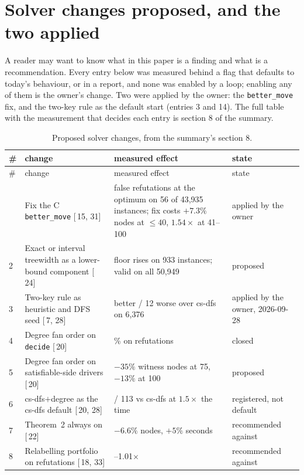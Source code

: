 \documentclass[11pt,a4paper]{article}
\renewcommand{\S}[1]{[\textsection\,#1]}
\newcommand{\code}[1]{\texttt{#1}}
\begin{document}
\section{Solver changes proposed, and the two applied}
\label{app:changes}

A reader may want to know what in this paper is a finding and what is a
recommendation. Every entry below was measured behind a flag that defaults to
today's behaviour, or in a report, and none was enabled by a loop; enabling
any of them is the owner's change. Two were applied by the owner: the
\code{better\_move} fix, and the two-key rule as the default start (entries 3 and 14). The full table with the
measurement that decides each entry is section 8 of the summary.

\footnotesize
\begin{longtable}{l>{\raggedright\arraybackslash}p{}>{\raggedright\arraybackslash}p{}>{\raggedright\arraybackslash}p{}}
\caption{Proposed solver changes, from the summary's section 8.}\\
\toprule
\# & change & measured effect & state \\
\midrule
\endfirsthead
\toprule
\# & change & measured effect & state \\
\midrule
\endhead
\bottomrule
\endfoot
1 & Fix the C \code{better\_move} \S{15, 31} & false refutations at the optimum on 56 of 43,935 instances; fix costs $+7.3\%$ nodes at $\le 40$, $1.54\times$ at 41--100 & applied by the owner \\
2 & Exact or interval treewidth as a lower-bound component \S{24} & floor rises on 933 instances; valid on all 50,949 & proposed \\
3 & Two-key rule as heuristic and DFS seed \S{7, 28} & 780 better / 12 worse over cs-dfs on 6,376 & applied by the owner, 2026-09-28 \\
4 & Degree fan order on \code{decide} \S{20} & 0.0\% on refutations & closed \\
5 & Degree fan order on satisfiable-side drivers \S{20} & $-35\%$ witness nodes at 75, $-13\%$ at 100 & proposed \\
6 & cs-dfs$+$degree as the cs-dfs default \S{20, 28} & 128 / 113 vs cs-dfs at $1.5\times$ the time & registered, not default \\
7 & Theorem~2 always on \S{22} & $-6.6\%$ nodes, $+5\%$ seconds & recommended against \\
8 & Relabelling portfolio on refutations \S{18, 33} & 1.00--1.01$\times$ & recommended against \\

\end{longtable}
\end{document}
